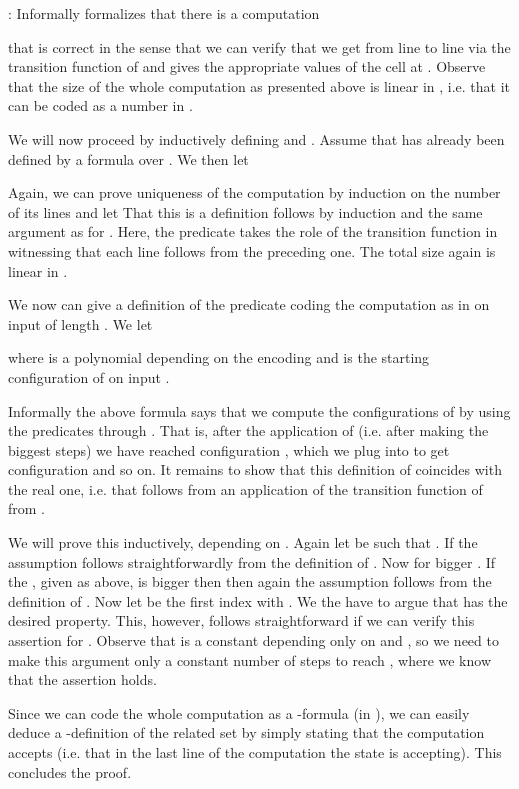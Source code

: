 \documentclass{LMCS}
\newenvironment{proof}{\QuadSpace\par\noindent{\bf
Proof}:}{\EndProof\HalfSpace} \fi
\newcommand{\QuadSpace}{}\newcommand{\HalfSpace}{}\newcommand{\FullSpace}{}\newcommand{\EndProof}{ \hfill \vrule width 1ex height 1ex depth 0pt }
\newenvironment{proof}{

\smallskip
\noindent\emph{Proof.}}{\hfill
\bigskip
} \fi
\begin{document}
\begin{proof}
  Informally  formalizes that there is a computation
  
  that is correct in the sense that we can verify that we get from line to line via the transition function of  and gives the appropriate values of the cell at . Observe that the size of the whole computation as presented above is linear in , i.e. that it can be coded as a number in .

  We will now proceed by inductively defining  and . Assume that
   has already been defined by a  formula over . We then let
  
  Again, we can prove uniqueness of the computation by induction on the number of its lines and let
   That this is a  definition follows by
  induction and the same argument as for . Here, the predicate  takes the role of the transition function in witnessing that each line follows from the preceding one. The total size again is linear in .


  We now can give a
   definition of the predicate  coding the computation as in  on input  of length . We let 
  
  where  is a polynomial depending on the encoding and  is the starting configuration of  on input
  .

  Informally the above formula says that we compute the configurations of  by using the predicates
   through . That is, after the application of 
  (i.e. after making the biggest steps) we have reached
  configuration , which we plug into  to get configuration  and so on.
  It remains to show that this definition of  coincides with the real one, i.e. that  follows from an application of the transition
  function of  from .

  We will prove this inductively, depending on . Again let  be such that .
  If  the assumption follows straightforwardly from the definition of
  . Now for bigger . If the , given as above, is bigger then  then
  again the assumption follows from the definition of . Now let  be the first index
  with . We the have to argue that  has the desired property.
  This, however, follows straightforward if we can verify this assertion for .
  Observe that  is a constant depending only on  and , so we need to make this argument only a
  constant number of steps to reach , where we know that the assertion holds.

  Since we can code the whole computation as a -formula (in ), we can easily deduce a
  -definition of the related set by simply stating that the computation accepts (i.e. that in the
  last line of the computation the state is accepting). This concludes the proof.
\end{proof}
\end{document}
